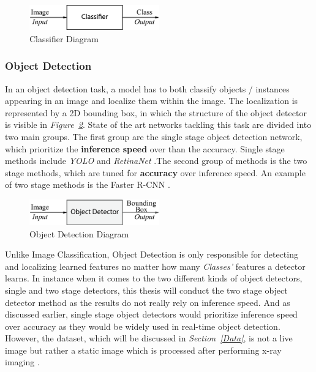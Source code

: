 \documentclass[12pt]{extarticle}
\begin{document}
	\begin{figure}[h]
		\centering
		\includegraphics[width=0.5\textwidth]{pics/Figures/Classifier_Block_Diagram.eps}
		\caption{\small{Classifier Diagram}}
		\label{fig:Classifier}
	\end{figure}
	\subsubsection{Object Detection}\label{Obj Detection}
	In an object detection task, a model has to both classify objects / instances appearing in an image and localize them within the image. The localization is represented by a 2D bounding box, in which the structure of the object detector is visible in \emph{Figure~\ref{fig:Obj Detector}}. State of the art networks tackling this task are divided into two main groups. The first group are the single stage object detection network, which prioritize the \textbf{inference speed} over than the accuracy. Single stage methods include \emph{YOLO} \cite{Objdet2} and \emph{RetinaNet} \cite{Retina}.The second group of methods is the two stage methods, which are tuned for \textbf{accuracy} over inference speed. An example of two stage methods is the Faster R-CNN \cite{Objdet}.
	\begin{figure}[h]
		\centering
		\includegraphics[width=0.5\textwidth]{pics/Figures/Obj_Det_Block_Diagram.eps}
		\caption{\small{Object Detection Diagram}}
		\label{fig:Obj Detector}
	\end{figure}
	Unlike Image Classification, Object Detection is only responsible for detecting and localizing learned features no matter how many \emph{Classes'} features a detector learns. In instance when it comes to the two different kinds of object detectors, single and two stage detectors, this thesis will conduct the two stage object detector method as the results do not really rely on inference speed. And as discussed earlier, single stage object detectors would prioritize inference speed over accuracy as they would be widely used in real-time object detection. However, the dataset, which will be discussed in \emph{Section~\ref{Data}}, is not a live image but rather a static image which is processed after performing x-ray imaging \cite{mammography}.
	
\end{document}
